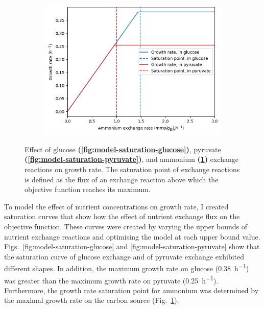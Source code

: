 \begin{figure}
  \begin{subfigure}[t]{0.45\textwidth}
  \centering
    \includegraphics[width=\linewidth]{saturation_amm}
    \caption{
    }
    \label{fig:model-saturation-ammonium}
  \end{subfigure}

  \caption{
    Effect of glucose \textbf{(\ref{fig:model-saturation-glucose})}, pyruvate \textbf{(\ref{fig:model-saturation-pyruvate})}, and ammonium \textbf{(\ref{fig:model-saturation-ammonium})} exchange reactions on growth rate.
    The saturation point of exchange reactions is defined as the flux of an exchange reaction above which the objective function reaches its maximum.
  }
  \label{fig:model-saturation}
\end{figure}

To model the effect of nutrient concentrations on growth rate, I created saturation curves that show how the effect of nutrient exchange flux on the objective function.
These curves were created by varying the upper bounds of nutrient exchange reactions and optimising the model at each upper bound value.
Figs.\ \ref{fig:model-saturation-glucose} and \ref{fig:model-saturation-pyruvate} show that the saturation curve of glucose exchange and of pyruvate exchange exhibited different shapes.
In addition, the maximum growth rate on glucose (\SI{0.38}{\hour^{-1}}) was greater than the maximum growth rate on pyruvate (\SI{0.25}{\hour^{-1}}).
Furthermore, the growth rate saturation point for ammonium was determined by the maximal growth rate on the carbon source (Fig.\ \ref{fig:model-saturation-ammonium}).

